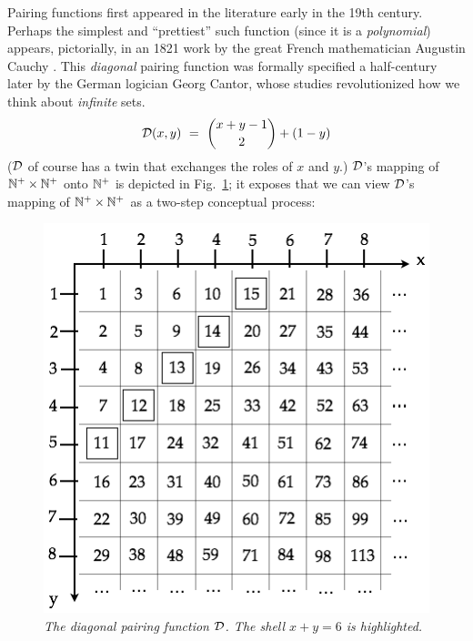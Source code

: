  
Pairing functions first appeared in the literature early in the 19th century.  Perhaps the simplest and ``prettiest'' such function (since it is a {\em polynomial}) appears, pictorially, in an 1821 work by the great French mathematician Augustin Cauchy \cite{Cauchy21}.  This {\em diagonal} pairing function was formally specified a half-century later by the German logician Georg Cantor, whose studies \cite{Cantor74,Cantor78} revolutionized how we think about {\em infinite} sets.
\begin{equation}
\label{eq:diag}
\mbox{$\cal D$}(x, y) \ = \
{{x+y-1} \choose 2} + (1-y)
\end{equation}
($\mbox{$\cal D$}$ of course has a twin that exchanges the roles of $x$ and $y$.)  $\mbox{$\cal D$}$'s mapping of $\mathbb{N}^+ \times \mathbb{N}^+$ onto $\mathbb{N}^+$ is depicted in Fig.~\ref{fig:diag}; it exposes that we can view $\mbox{$\cal D$}$'s mapping of $\mathbb{N}^+ \times \mathbb{N}^+$ as a two-step conceptual process:
\begin{figure}[htb]
\begin{center}
      \includegraphics[scale=0.4]{FiguresArithmetic/PairingDiagonal}
\end{center}
\caption{{\it The diagonal pairing function $\mbox{$\cal D$}$.  The shell $x+y = 6$
    is highlighted.}
\label{fig:diag}}
\end{figure}
